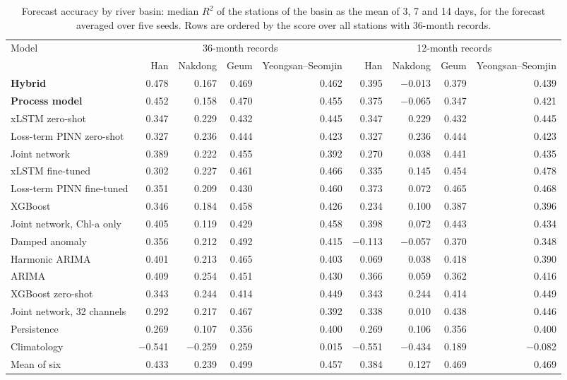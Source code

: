 \begin{table}[tbp]
\centering
\caption{Forecast accuracy by river basin: median $R^2$ of the stations of the basin as the mean of 3, 7 and 14 days, for the forecast averaged over five seeds. Rows are ordered by the score over all stations with 36-month records.}
\label{tab:S_basin}
\footnotesize
\setlength{\tabcolsep}{3.5pt}
\begin{adjustbox}{max width=\textwidth}
\begin{tabular}{lrrrrrrrr}
\toprule
Model & \multicolumn{4}{c}{36-month records} & \multicolumn{4}{c}{12-month records} \\ \cmidrule(lr){2-5}\cmidrule(lr){6-9}
 & Han & Nakdong & Geum & Yeongsan--Seomjin & Han & Nakdong & Geum & Yeongsan--Seomjin \\
\midrule
\textbf{Hybrid} & 0.478 & 0.167 & 0.469 & 0.462 & 0.395 & $-$0.013 & 0.379 & 0.439 \\
\textbf{Process model} & 0.452 & 0.158 & 0.470 & 0.455 & 0.375 & $-$0.065 & 0.347 & 0.421 \\
xLSTM zero-shot & 0.347 & 0.229 & 0.432 & 0.445 & 0.347 & 0.229 & 0.432 & 0.445 \\
Loss-term PINN zero-shot & 0.327 & 0.236 & 0.444 & 0.423 & 0.327 & 0.236 & 0.444 & 0.423 \\
Joint network & 0.389 & 0.222 & 0.455 & 0.392 & 0.270 & 0.038 & 0.441 & 0.435 \\
xLSTM fine-tuned & 0.302 & 0.227 & 0.461 & 0.466 & 0.335 & 0.145 & 0.454 & 0.478 \\
Loss-term PINN fine-tuned & 0.351 & 0.209 & 0.430 & 0.460 & 0.373 & 0.072 & 0.465 & 0.468 \\
XGBoost & 0.346 & 0.184 & 0.458 & 0.426 & 0.234 & 0.100 & 0.387 & 0.396 \\
Joint network, Chl-a only & 0.405 & 0.119 & 0.429 & 0.458 & 0.398 & 0.072 & 0.443 & 0.434 \\
Damped anomaly & 0.356 & 0.212 & 0.492 & 0.415 & $-$0.113 & $-$0.057 & 0.370 & 0.348 \\
Harmonic ARIMA & 0.401 & 0.213 & 0.465 & 0.403 & 0.069 & 0.038 & 0.418 & 0.390 \\
ARIMA & 0.409 & 0.254 & 0.451 & 0.430 & 0.366 & 0.059 & 0.362 & 0.416 \\
XGBoost zero-shot & 0.343 & 0.244 & 0.414 & 0.449 & 0.343 & 0.244 & 0.414 & 0.449 \\
Joint network, 32 channels & 0.292 & 0.217 & 0.467 & 0.392 & 0.338 & 0.010 & 0.438 & 0.446 \\
Persistence & 0.269 & 0.107 & 0.356 & 0.400 & 0.269 & 0.106 & 0.356 & 0.400 \\
Climatology & $-$0.541 & $-$0.259 & 0.259 & 0.015 & $-$0.551 & $-$0.434 & 0.189 & $-$0.082 \\
\midrule
Mean of six & 0.433 & 0.239 & 0.499 & 0.457 & 0.384 & 0.127 & 0.469 & 0.469 \\
\bottomrule
\end{tabular}
\end{adjustbox}
\end{table}
